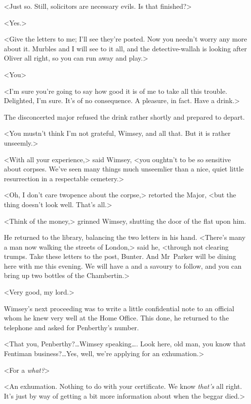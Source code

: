 <Just so. Still, solicitors are necessary evils. Is that finished?>

<Yes.>

<Give the letters to me; I'll see they're posted. Now you needn't worry any more about it. Murbles and I will see to it all, and the detective-wallah is looking after Oliver all right, so you can run away and play.>

<You\longdash>

<I'm sure you're going to say how good it is of me to take all this trouble. Delighted, I'm sure. It's of no consequence. A pleasure, in fact. Have a drink.>

The disconcerted major refused the drink rather shortly and prepared to depart.

<You mustn't think I'm not grateful, Wimsey, and all that. But it is rather unseemly.>

<With all your experience,> said Wimsey, <you oughtn't to be so sensitive about corpses. We've seen many things much unseemlier than a nice, quiet little resurrection in a respectable cemetery.>

<Oh, I don't care twopence about the corpse,> retorted the Major, <but the thing doesn't look well. That's all.>

<Think of the money,> grinned Wimsey, shutting the door of the flat upon him.

He returned to the library, balancing the two letters in his hand. <There's many a man now walking the streets of London,> said he, <through not clearing trumps. Take these letters to the post, Bunter. And Mr~Parker will be dining here with me this evening. We will have a  and a savoury to follow, and you can bring up two bottles of the Chambertin.>

<Very good, my lord.>

Wimsey's next proceeding was to write a little confidential note to an official whom he knew very well at the Home Office. This done, he returned to the telephone and asked for Penberthy's number.

<That you, Penberthy?\dots Wimsey speaking\dots. Look here, old man, you know that Fentiman business?\dots Yes, well, we're applying for an exhumation.>

<For a \emph{what?}>

<An exhumation. Nothing to do with your certificate. We know \emph{that's} all right. It's just by way of getting a bit more information about when the beggar died.>

